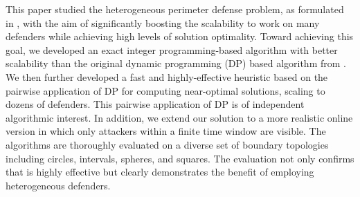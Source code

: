 This paper studied the heterogeneous perimeter defense problem, as formulated in \cite{adler2022role}, with the aim of
significantly boosting the scalability to work on many defenders while achieving high levels of solution optimality.
Toward achieving this goal, we developed an exact integer programming-based algorithm with better scalability than the original dynamic programming (DP) based algorithm from \cite{adler2022role}. We then further developed a fast and highly-effective heuristic based on the pairwise application of DP for computing near-optimal solutions, scaling to dozens of defenders.
%
This pairwise application of DP is of independent algorithmic interest. 
%
In addition, we extend our solution to a more realistic online version in which only attackers within a finite time window are visible. 
%
The algorithms are thoroughly evaluated on a diverse set of boundary topologies including circles, intervals, spheres, and squares. 
%
The evaluation not only confirms that \ours is highly effective but clearly demonstrates the benefit of employing heterogeneous defenders. 